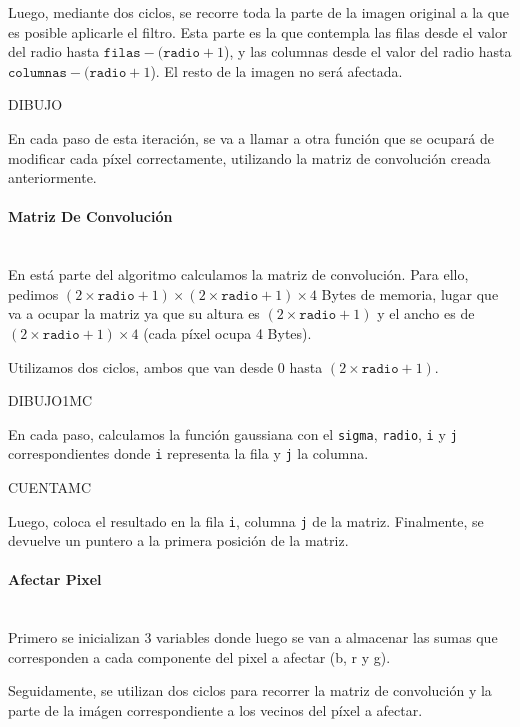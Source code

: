       Luego, mediante dos ciclos, se recorre toda la parte de la imagen original a la que es posible aplicarle el filtro. Esta parte es la que contempla las filas desde el valor del radio hasta $\mathtt{filas} - (\mathtt{radio} + 1$), y las columnas desde el valor del radio hasta $\mathtt{columnas} - (\mathtt{radio} + 1$). El resto de la imagen no será afectada. 

      DIBUJO

      En cada paso de esta iteración, se va a llamar a otra función que se ocupará de modificar cada píxel correctamente, utilizando la matriz de convolución creada anteriormente. 

      \paragraph{Matriz De Convolución} \mbox{} \\
        En está parte del algoritmo calculamos la matriz de convolución. Para ello, pedimos $(2 \times \mathtt{radio} + 1) \times (2 \times \mathtt{radio} + 1) \times 4$ Bytes de memoria, lugar que va a ocupar la matriz ya que su altura es $(2 \times \mathtt{radio} + 1)$ y el ancho es de $(2 \times \mathtt{radio} + 1) \times 4$ (cada píxel ocupa 4 Bytes).
        
        Utilizamos dos ciclos, ambos que van desde 0 hasta $(2 \times \mathtt{radio} + 1)$. 
        
        DIBUJO1MC

        En cada paso, calculamos la función gaussiana con el \texttt{sigma}, \texttt{radio}, \texttt{i} y \texttt{j} correspondientes donde \texttt{i} representa la fila y \texttt{j} la columna.  
        
        CUENTAMC
    
        Luego, coloca el resultado en la fila \texttt{i}, columna \texttt{j} de la matriz. Finalmente, se devuelve un puntero a la primera posición de la matriz.

      \paragraph{Afectar Pixel} \mbox{} \\
        Primero se inicializan 3 variables donde luego se van a almacenar las sumas que corresponden a cada componente del pixel a afectar (b, r y g). 

        Seguidamente, se utilizan dos ciclos para recorrer la matriz de convolución y la parte de la imágen correspondiente a los vecinos del píxel a afectar.  
        
